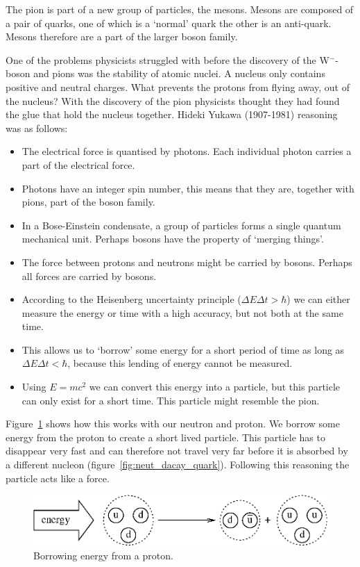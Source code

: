 \documentclass[12pt,a4paper]{article}
\numberwithin{equation}{section}
\numberwithin{figure}{section}
\numberwithin{table}{section}
\begin{document}
The pion is part of a new group of particles, the mesons. Mesons are composed of a pair of quarks, one of which is a `normal' quark the other is an anti-quark. Mesons therefore are a part of the larger boson family.

One of the problems physicists struggled with before the discovery of the W$^-$-boson and pions was the stability of atomic nuclei. A nucleus only contains positive and neutral charges. What prevents the protons from flying away, out of the nucleus? With the discovery of the pion physicists thought they had found the glue that hold the nucleus together. Hideki Yukawa (1907-1981) reasoning was as follows:
\begin{itemize}
\item The electrical force is quantised by photons. Each individual photon carries a part of the electrical force.
\item Photons have an integer spin number, this means that they are, together with pions, part of the boson family.
\item In a Bose-Einstein condensate, a group of particles forms a single quantum mechanical unit. Perhaps bosons have the property of `merging things'.
\item The force between protons and neutrons might be carried by bosons. Perhaps all forces are carried by bosons.
\item According to the Heisenberg uncertainty principle ($\Delta E \Delta t > \hbar$) we can either measure the energy or time with a high accuracy, but not both at the same time.
\item This allows us to `borrow' some energy for a short period of time as long as $\Delta E \Delta t < \hbar$, because this lending of energy cannot be measured.
\item Using $E=mc^2$ we can convert this energy into a particle, but this particle can only exist for a short time. This particle might resemble the pion.
\end{itemize}

Figure~\ref{fig:borrowing_energy} shows how this works with our neutron and proton. We borrow some energy from the proton to create a short lived particle. This particle has to disappear very fast and can therefore not travel very far before it is absorbed by a different nucleon (figure~\ref{fig:neut_dacay_quark}). Following this reasoning the particle acts like a force.

\begin{figure}\begin{center}
\includegraphics[scale=1]{borrowing_energy.eps}%
\caption{Borrowing energy from a proton.}\label{fig:borrowing_energy}
\end{center}\end{figure}
\end{document}

